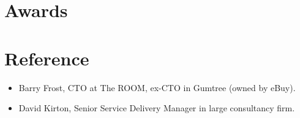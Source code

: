 \documentclass[a4paper]{twentysecondcv-english} %
\begin{document}
\section{Awards}

\begin{twentyshort} %
\end{twentyshort}

\section{Reference}
\begin{itemize}
    \item Barry Frost, CTO at The ROOM, ex-CTO in Gumtree (owned by eBuy).
    \item David Kirton, Senior Service Delivery Manager in large consultancy firm.
\end{itemize}
\end{document}
